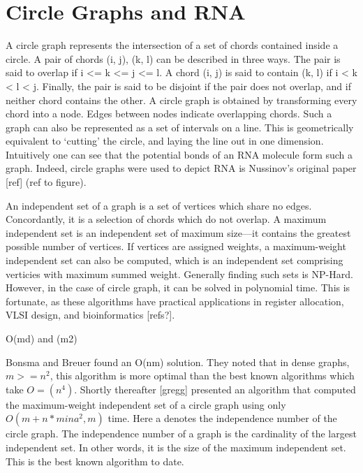 \documentclass[12pt, a4paper]{article}
\begin{document}
\section*{Circle Graphs and RNA}
A circle graph represents the intersection of a set of chords contained inside a circle.
A pair of chords (i, j), (k, l) can be described in three ways. The pair is said to overlap if i <= k <= j <= l. A chord (i, j) is said to contain (k, l) if i < k < l < j. Finally, the pair is said to be disjoint if the pair does not overlap, and if neither chord contains the other. A circle graph is obtained by transforming every chord into a node. Edges between nodes indicate overlapping chords. Such a graph can also be represented as a set of intervals on a line. This is geometrically equivalent to ‘cutting’ the circle, and laying the line out in one dimension. Intuitively one can see that the potential bonds of an RNA molecule form such a graph. Indeed, circle graphs were used to depict RNA is Nussinov's original paper [ref] (ref to figure).

An independent set of a graph is a set of vertices which share no edges. Concordantly, it is a selection of chords which do not overlap. A maximum independent set is an independent set of maximum size---it contains the greatest possible number of vertices. If vertices are assigned weights, a maximum-weight independent set can also be computed, which is an independent set comprising verticies with maximum summed weight. Generally finding such sets is NP-Hard. However, in the case of circle graph, it can be solved in polynomial time. This is fortunate, as these algorithms have practical applications in register allocation, VLSI design, and bioinformatics [refs?].

O(md) and (m2)

Bonsma and Breuer found an O(nm) solution. They noted that in dense graphs, $m >= n^2$, this algorithm is more optimal than the best known algorithms which take $O=(n^4)$. Shortly thereafter [gregg] presented an algorithm that computed the maximum-weight independent set of a circle graph using only $O(m + n*min{a^2, m})$ time. Here a denotes the independence number of the circle graph. The independence number of a graph is the cardinality of the largest independent set. In other words, it is the size of the maximum independent set. This is the best known algorithm to date.
\end{document}
